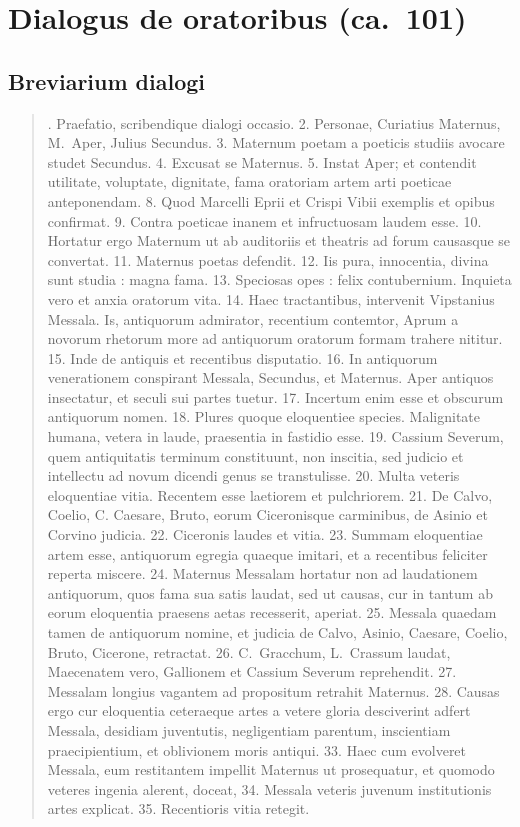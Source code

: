 
\section*{Dialogus de oratoribus (ca.~101)}

\subsection*{Breviarium dialogi}

\begin{quotation}

. Praefatio, scribendique dialogi occasio. 2. Personae, Curiatius Maternus, M.~Aper, Julius Secundus. 3. Maternum poetam a poeticis studiis avocare studet Secundus. 4. Excusat se Maternus. 5. Instat Aper; et contendit utilitate, voluptate, dignitate, fama oratoriam artem arti poeticae anteponendam. 8. Quod Marcelli Eprii et Crispi Vibii exemplis et opibus confirmat. 9. Contra poeticae inanem et infructuosam laudem esse. 10. Hortatur ergo Maternum ut ab auditoriis et theatris ad forum causasque se convertat. 11. Maternus poetas defendit. 12. Iis pura, innocentia, divina sunt studia : magna fama. 13. Speciosas opes : felix contubernium. Inquieta vero et anxia oratorum vita. 14. Haec tractantibus, intervenit Vipstanius Messala. Is, antiquorum admirator, recentium contemtor, Aprum a novorum rhetorum more ad antiquorum oratorum formam trahere nititur. 15. Inde de antiquis et recentibus disputatio. 16. In antiquorum venerationem conspirant Messala, Secundus, et Maternus. Aper antiquos insectatur, et seculi sui partes tuetur. 17. Incertum enim esse et obscurum antiquorum nomen. 18. Plures quoque eloquentiee species. Malignitate humana, vetera in laude, praesentia in fastidio esse. 19. Cassium Severum, quem antiquitatis terminum constituunt, non inscitia, sed judicio et intellectu ad novum dicendi genus se transtulisse. 20. Multa veteris eloquentiae vitia. Recentem esse laetiorem et pulchriorem. 21. De Calvo, Coelio, C. Caesare, Bruto, eorum Ciceronisque carminibus, de Asinio et Corvino judicia. 22. Ciceronis laudes et vitia. 23. Summam eloquentiae artem esse, antiquorum egregia quaeque imitari, et a recentibus feliciter reperta miscere. 24. Maternus Messalam hortatur non ad laudationem antiquorum, quos fama sua satis laudat, sed ut causas, cur in tantum ab eorum eloquentia praesens aetas recesserit, aperiat. 25. Messala quaedam tamen de antiquorum nomine, et judicia de Calvo, Asinio, Caesare, Coelio, Bruto, Cicerone, retractat. 26. C.~Gracchum, L.~Crassum laudat, Maecenatem vero, Gallionem et Cassium Severum reprehendit. 27. Messalam longius vagantem ad propositum retrahit Maternus. 28. Causas ergo cur eloquentia ceteraeque artes a vetere gloria desciverint adfert Messala, desidiam juventutis, negligentiam parentum, inscientiam praecipientium, et oblivionem moris antiqui. 33. Haec cum evolveret Messala, eum restitantem impellit Maternus ut prosequatur, et quomodo veteres ingenia alerent, doceat, 34. Messala veteris juvenum institutionis artes explicat. 35. Recentioris vitia retegit. 


\end{quotation}
